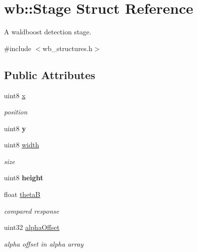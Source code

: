\hypertarget{structwb_1_1_stage}{}\section{wb\+:\+:Stage Struct Reference}
\label{structwb_1_1_stage}


A waldboost detection stage.  




{\ttfamily \#include $<$wb\+\_\+structures.\+h$>$}

\subsection*{Public Attributes}
\begin{DoxyCompactItemize}
\item 
\hypertarget{structwb_1_1_stage_af56278d9aea7d089dabc36cf728b7a21}{}uint8 \hyperlink{structwb_1_1_stage_af56278d9aea7d089dabc36cf728b7a21}{x}\label{structwb_1_1_stage_af56278d9aea7d089dabc36cf728b7a21}

\begin{DoxyCompactList}\small\item\em position \end{DoxyCompactList}\item 
\hypertarget{structwb_1_1_stage_a839664aa84f7a421d70766c2f1bd28a7}{}uint8 {\bfseries y}\label{structwb_1_1_stage_a839664aa84f7a421d70766c2f1bd28a7}

\item 
\hypertarget{structwb_1_1_stage_aadc51276d2281146c172125c310b6c98}{}uint8 \hyperlink{structwb_1_1_stage_aadc51276d2281146c172125c310b6c98}{width}\label{structwb_1_1_stage_aadc51276d2281146c172125c310b6c98}

\begin{DoxyCompactList}\small\item\em size \end{DoxyCompactList}\item 
\hypertarget{structwb_1_1_stage_ac6b963a8ac49573caa27fd88d5ef9f4f}{}uint8 {\bfseries height}\label{structwb_1_1_stage_ac6b963a8ac49573caa27fd88d5ef9f4f}

\item 
\hypertarget{structwb_1_1_stage_a0068e63c0f28d015c62a3e1032602bcd}{}float \hyperlink{structwb_1_1_stage_a0068e63c0f28d015c62a3e1032602bcd}{theta\+B}\label{structwb_1_1_stage_a0068e63c0f28d015c62a3e1032602bcd}

\begin{DoxyCompactList}\small\item\em compared response \end{DoxyCompactList}\item 
\hypertarget{structwb_1_1_stage_a31da72c77e291c77751a5d457ca4a434}{}uint32 \hyperlink{structwb_1_1_stage_a31da72c77e291c77751a5d457ca4a434}{alpha\+Offset}\label{structwb_1_1_stage_a31da72c77e291c77751a5d457ca4a434}

\begin{DoxyCompactList}\small\item\em alpha offset in alpha array \end{DoxyCompactList}\end{DoxyCompactItemize}



